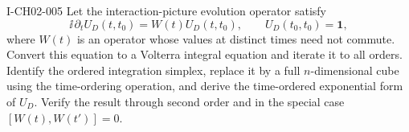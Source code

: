 \begin{exercise}{I-CH02-005}
Let the interaction-picture evolution operator satisfy
\[
  \ii\,\partial_t U_D(t,t_0)=W(t)U_D(t,t_0),
  \qquad U_D(t_0,t_0)=\mathbf1,
\]
where $W(t)$ is an operator whose values at distinct times need not commute.
Convert this equation to a Volterra integral equation and iterate it to all
orders. Identify the ordered integration simplex, replace it by a full
$n$-dimensional cube using the time-ordering operation, and derive the
time-ordered exponential form of $U_D$. Verify the result through second order
and in the special case $[W(t),W(t')]=0$.
\end{exercise}
